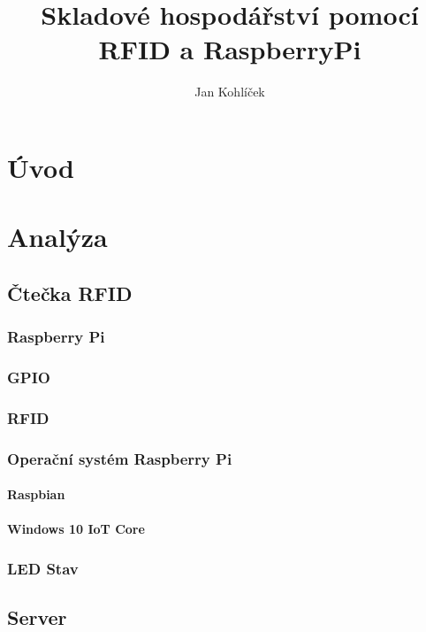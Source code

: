 \documentclass[czech,BP]{thesiskiv}
\author{Jan Kohlíček}
\title{Skladové hospodářství pomocí RFID a RaspberryPi}
\begin{document}
\maketitle
\tableofcontents


\chapter{Úvod}
	\cite{KnuthAOCP2}
	\cite{Hoare1961}
	\cite{Graphics2D}
	
\chapter{Analýza}

	\section{Čtečka RFID}

	
		\subsection{Raspberry Pi}
	
		\subsection{GPIO}
	
	
		\subsection{RFID}
			
	
		\subsection{Operační systém Raspberry Pi}
			\subsubsection{Raspbian}
			
		
			\subsubsection{Windows 10 IoT Core}
			
		\subsection{LED Stav}
	
	\section{Server}
\end{document}
